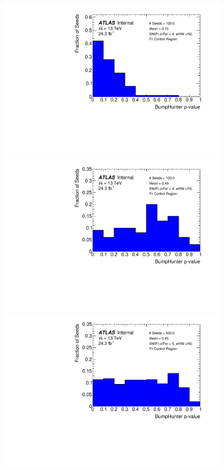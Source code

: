 \begin{figure}[!htb]
\captionsetup[subfigure]{aboveskip=0pt,justification=centering}
\centering
{} {
  \includegraphics[width=0.48\linewidth, angle=0]{figs/Dibjet/LowMass/FitStudy_min566/pVal_bumpHunter_corrFitCR_4para_low16_high16.pdf}
}                                                                                              
 {                                                    
  \includegraphics[width=0.48\linewidth, angle=0]{figs/Dibjet/LowMass/FitStudy_min566/pVal_bumpHunter_corrFitCR_4para_low10_high10.pdf}
}                                                                                              
 {                                                    
  \includegraphics[width=0.48\linewidth, angle=0]{figs/Dibjet/LowMass/FitStudy_min566/pVal_bumpHunter_corrFitCR_5para_low16_high16.pdf}
}                                                                                              

\end{figure}
